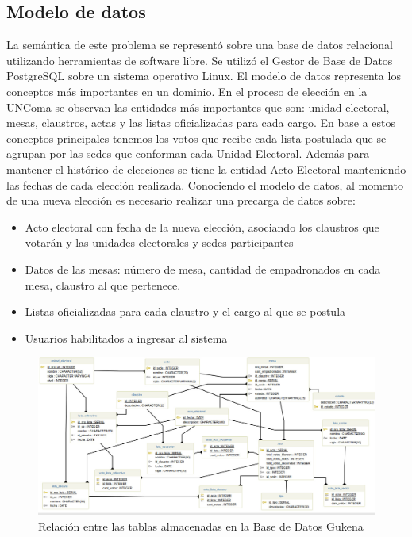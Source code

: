 \subsection{Modelo de datos}

La semántica de este problema se representó sobre una base de datos relacional utilizando herramientas de software libre. Se utilizó el Gestor de Base de Datos PostgreSQL sobre un sistema operativo Linux. El modelo de datos representa los conceptos más importantes en un dominio. En el proceso de elección en la UNComa se observan las entidades más importantes que son: unidad electoral, mesas, claustros, actas y las listas oficializadas para cada cargo. En base a estos conceptos principales tenemos los votos que recibe cada lista postulada que se agrupan por las sedes que conforman cada Unidad Electoral. Además para mantener el histórico de elecciones se tiene la entidad Acto Electoral manteniendo las fechas de cada elección realizada.\newline
Conociendo el modelo de datos, al momento de una nueva elección es necesario realizar una precarga de datos sobre:
\begin{itemize}
    \item Acto electoral con fecha de la nueva elección, asociando los claustros que votarán y las unidades electorales y sedes participantes
    \item Datos de las mesas: número de mesa, cantidad de empadronados en cada mesa, claustro al que pertenece.
    \item Listas oficializadas para cada claustro y el cargo al que se postula
    \item Usuarios habilitados a ingresar al sistema
\end{itemize}
\begin{figure}[h!]
  \includegraphics[width=\textwidth]{img/gu_kena_diagramaBD.jpg}
  \caption{Relación entre las tablas almacenadas en la Base de Datos Gukena}
  \label{graf:diagramaBD}
\end{figure}

